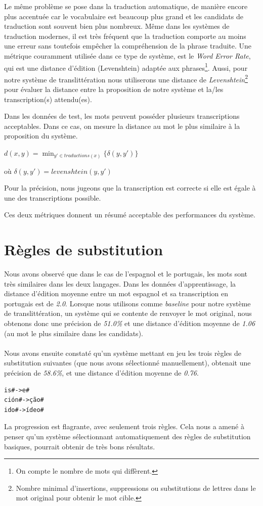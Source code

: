 \documentclass{article}
\begin{document}
Le même problème se pose dans la traduction automatique, de manière encore plus accentuée car le vocabulaire est beaucoup plus grand et les candidats de traduction sont souvent bien plus nombreux. Même dans les systèmes de traduction modernes, il est très fréquent que la traduction comporte au moins une erreur sans toutefois empêcher la compréhension de la phrase traduite. Une métrique couramment utilisée dans ce type de système, est le \emph{Word Error Rate}, qui est une distance d'édition (Levenshtein) adaptée aux phrases\footnote{On compte le nombre de mots qui diffèrent.}.
Aussi, pour notre système de translittération nous utiliserons une distance de \emph{Levenshtein}\footnote{Nombre minimal d'insertions, suppressions ou substitutions de lettres dans le mot original pour obtenir le mot cible.} pour évaluer la distance entre la proposition de notre système et la/les transcription(s) attendu(es).

Dans les données de test, les mots peuvent posséder plusieurs transcriptions acceptables. Dans ce cas, on mesure la distance au mot le plus similaire à la proposition du système.

\begin{center}
$\displaystyle d(x,y) = \min_{y' \in traductions(x)} \{\delta(y,y')\}$

où $\delta(y,y')=levenshtein(y,y')$
\end{center}

Pour la précision, nous jugeons que la transcription est correcte si elle est égale à une des transcriptions possible.

Ces deux métriques donnent un résumé acceptable des performances du système.

\section{Règles de substitution}
Nous avons observé que dans le cas de l'espagnol et le portugais, les mots sont très similaires dans les deux langages. Dans les données d'apprentissage, la distance d'édition moyenne entre un mot espagnol et sa transcription en portugais est de \emph{2.0}.
Lorsque nous utilisons comme \emph{baseline} pour notre système de translittération, un système qui se contente de renvoyer le mot original, nous obtenons donc une précision de \emph{51.0\%} et une distance d'édition moyenne de \emph{1.06} (au mot le plus similaire dans les candidats).

\paragraph{}
Nous avons ensuite constaté qu'un système mettant en jeu les trois règles de substitution suivantes (que nous avons sélectionné manuellement), obtenait une précision de \emph{58.6\%}, et une distance d'édition moyenne de \emph{0.76}.
\begin{verbatim}
is#->e#
ción#->ção#
ido#->ídeo#
\end{verbatim}
La progression est flagrante, avec seulement trois règles. Cela nous a amené à penser qu'un système sélectionnant automatiquement des règles de substitution basiques, pourrait obtenir de très bons résultats.
\end{document}

